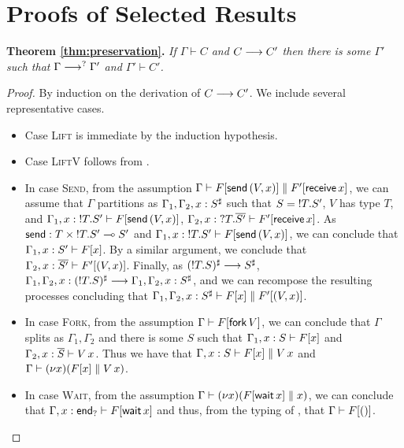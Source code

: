 \documentclass[oribibl,orivec,envcountsame]{llncs}
\begin{document}
\section{Proofs of Selected Results}


\noindent
\textbf{Theorem \ref{thm:preservation}.}
\textit{If $\Gamma \vdash C$ and $C \longrightarrow C'$ then there is some $\Gamma'$ such that $\Gamma
  \longrightarrow^?  \Gamma'$ and $\Gamma' \vdash C'$.}

\begin{proof}
  By induction on the derivation of $C \longrightarrow C'$.  We include several representative cases.
  \begin{itemize}
  \item Case \textsc{Lift} is immediate by the induction hypothesis.
  \item Case \textsc{LiftV} follows from .
  \item In case \textsc{Send}, from the assumption $\Gamma \vdash F[\mathsf{send}\,(V,x)] \parallel
    F'[\mathsf{receive} \, x]$, we can assume that $\Gamma$ partitions as
    $\Gamma_1,\Gamma_2,x:S^\sharp$ such that $S = {!T.S'}$, $V$ has type $T$, and
    $\Gamma_1,x:{!T.S'} \vdash F[\mathsf{send} \, (V,x)]$,
    $\Gamma_2,x:{?T.\overline{S'}} \vdash F'[\mathsf{receive} \, x]$.  As $\mathsf{send} : T
    \times {!T.S'} \multimap S'$ and $\Gamma_1,x:{!T.S'} \vdash F[\mathsf{send} \,
    (V,x)]$, we can conclude that $\Gamma_1,x:S' \vdash F[x]$.  By a similar argument, we conclude
    that $\Gamma_2,x:\overline{S'} \vdash F'[(V,x)]$. Finally, as $({!T.S})^\sharp \longrightarrow
    S^\sharp$, $\Gamma_1,\Gamma_2,x:({!T.S})^\sharp \longrightarrow
    \Gamma_1,\Gamma_2,x:S^\sharp$, and we can recompose the resulting processes concluding that
    $\Gamma_1,\Gamma_2,x:S^\sharp \vdash F[x] \parallel F'[(V,x)]$.
  \item In case \textsc{Fork}, from the assumption $\Gamma \vdash F[\mathsf{fork} \, V]$, we
    can conclude that $\Gamma$ splits as $\Gamma_1,\Gamma_2$ and there is some $S$ such that
    $\Gamma_1,x:S \vdash F[x]$ and $\Gamma_2,x:\overline{S} \vdash V \, x$.  Thus we have that
    $\Gamma,x:S \vdash F[x] \parallel V \, x$ and $\Gamma \vdash (\nu x)(F[x] \parallel V \,
    x)$.
  \item In case \textsc{Wait}, from the assumption $\Gamma \vdash (\nu x)(F[\mathsf{wait} \,
    x] \parallel x)$, we can conclude that $\Gamma,x:\mathsf{end}_? \vdash F[\mathsf{wait} \, x]$ and
    thus, from the typing of , that $\Gamma \vdash F[()]$.

\end{itemize}
\end{proof}
\end{document}
